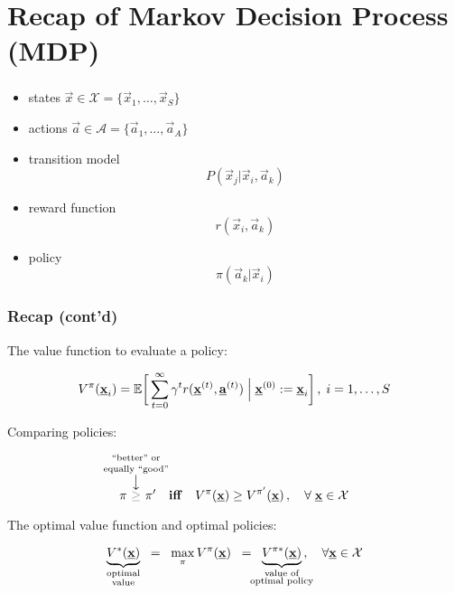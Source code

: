 \section{Recap of Markov Decision Process (MDP)}


\begin{frame}\frametitle{\secname}

\begin{itemize}
\item[] states $\vec x \in \mathcal{X} = \{ \vec x_1, \ldots, \vec x_S\}$
\item[] actions $\vec a \in \mathcal{A} = \{ \vec a_1, \ldots, \vec a_A\}$
\item[] transition model
$$P(\vec x_j | \vec x_i, \vec a_k)$$
\pause
\item[] reward function
$$r(\vec x_i, \vec a_k)$$
\item[] policy
$$
\pi(\vec a_k | \vec x_i)$$
\end{itemize}

\end{frame}

\begin{frame}\frametitle{Recap (cont'd)}

The value function to evaluate a policy:

	\begin{align}
	V^\pi(\underline{\mathbf{x}}_i) =
	\mathbb{E} \bigg\lbrack
	\sum_{t=0}^{\infty} \gamma^t r(\underline{\mathbf{x}}^{(t)}, \underline{\mathbf{a}}^{(t)}) \;\Big|\; \underline{\mathbf{x}}^{(0)} := \underline{\mathbf{x}}_i
	\bigg\rbrack\,, \; i=1,\ldots,S
	\end{align}
	
	
Comparing policies:

\begin{equation}
\pi~
\overset{\mathclap{\substack{%
					\text{``better'' or}\\[1mm]\text{equally ``good''}\\ \big\downarrow
					}}}{{\color{gray}\ge}}
~\pi' 
\quad \text{\textbf{iff}} \quad V^{\pi} (\vec x) \ge V^{\pi'} (\vec x)\,,\quad \forall\; \vec x \in \mathcal{X}
\end{equation}

The optimal value function and optimal policies:

\begin{equation}
\underbrace{V^{*}(\vec x)}_{\substack{\text{optimal}\\ \text{value}}}
\;\;=\;\; \max_{\pi} V^{\pi} (\vec x)
\;\;=\;\; \underbrace{V^{\pi*}(\vec x)}_{\mathclap{\substack{\text{value of}\\ \text{optimal policy}}}}\,,\quad \forall \vec x \in \mathcal{X}
\end{equation}

\end{frame}


